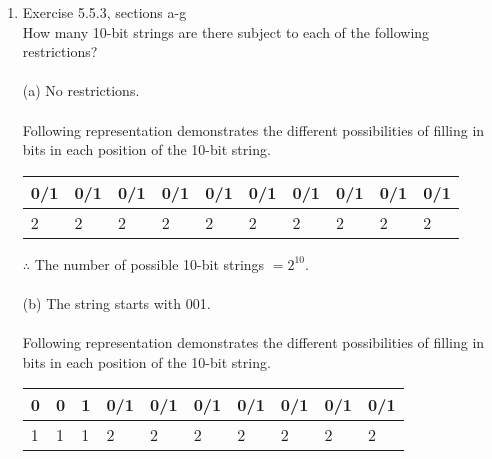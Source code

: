 \documentclass[14pt]{extreport}
\begin{document}
\begin{enumerate}[label=(\alph*)]
\item  Exercise	5.5.3,	sections	a-g\\
\newline
How many 10-bit strings are there subject to each of the following restrictions? \\\\
(a) No restrictions. \\\\
Following representation demonstrates the different possibilities of filling in bits in each position of the 10-bit string.

\begin{table}[h]
\centering
\begin{tabular}{llllllllll}
\hline
\multicolumn{1}{|l|}{0/1} & \multicolumn{1}{l|}{0/1} & \multicolumn{1}{l|}{0/1} & \multicolumn{1}{l|}{0/1} & \multicolumn{1}{l|}{0/1} & \multicolumn{1}{l|}{0/1} & \multicolumn{1}{l|}{0/1} & \multicolumn{1}{l|}{0/1} & \multicolumn{1}{l|}{0/1} & \multicolumn{1}{l|}{0/1} \\ \hline
2                         & 2                        & 2                        & 2                        & 2                        & 2                        & 2                        & 2                        & 2                        & 2                       
\end{tabular}
\end{table}

$\therefore$ The number of possible 10-bit strings $= 2^{10}.$ \\\\
\newpage
(b) The string starts with 001. \\\\
Following representation demonstrates the different possibilities of filling in bits in each position of the 10-bit string.

\begin{table}[ht]
\centering
\begin{tabular}{llllllllll}
\hline
\multicolumn{1}{|l|}{0} & \multicolumn{1}{l|}{0} & \multicolumn{1}{l|}{1} & \multicolumn{1}{l|}{0/1} & \multicolumn{1}{l|}{0/1} & \multicolumn{1}{l|}{0/1} & \multicolumn{1}{l|}{0/1} & \multicolumn{1}{l|}{0/1} & \multicolumn{1}{l|}{0/1} & \multicolumn{1}{l|}{0/1} \\ \hline
1                       & 1                      & 1                      & 2                        & 2                        & 2                        & 2                        & 2                        & 2                        & 2                       
\end{tabular}
\end{table}


\end{enumerate}
\end{document}
